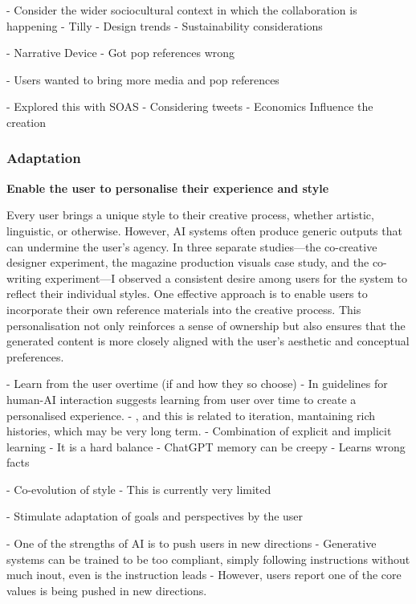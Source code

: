 - Consider the wider sociocultural context in which the collaboration is happening
- Tilly
    - Design trends
    - Sustainability considerations

- Narrative Device
    - Got pop references wrong

- Users wanted to bring more media and pop references

- Explored this with SOAS
    - Considering tweets
    - Economics
    Influence the creation

\subsubsection{Adaptation}

    
\item \textbf{Enable the user to personalise their experience and style}

Every user brings a unique style to their creative process, whether artistic, linguistic, or otherwise. However, AI systems often produce generic outputs that can undermine the user’s agency. In three separate studies---the co-creative designer experiment, the magazine production visuals case study, and the co-writing experiment---I observed a consistent desire among users for the system to reflect their individual styles. One effective approach is to enable users to incorporate their own reference materials into the creative process. This personalisation not only reinforces a sense of ownership but also ensures that the generated content is more closely aligned with the user's aesthetic and conceptual preferences.


- Learn from the user overtime (if and how they so choose)
    - In guidelines for human-AI interaction \cite{Amershi2019-vy} suggests learning from user over time to create a personalised experience. 
    - \cite{Resnick2005-fs}, and this is related to iteration, mantaining rich histories, which may be very long term. 
    - Combination of explicit and implicit learning
    - It is a hard balance
    - ChatGPT memory can be creepy
    - Learns wrong facts
   
    - Co-evolution of style
    - This is currently very limited
    
- Stimulate adaptation of goals and perspectives by the user

    - One of the strengths of AI is to push users in new directions
    - Generative systems can be trained to be too compliant, simply following instructions without much inout, even is the instruction leads 
    - However, users report one of the core values is being pushed in new directions.

